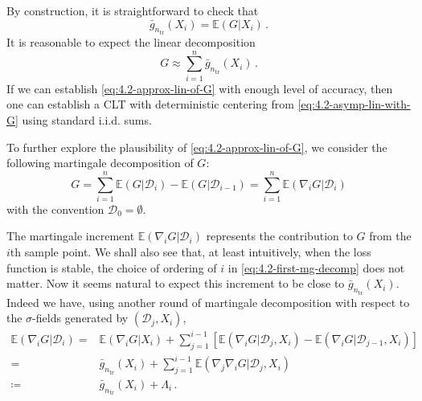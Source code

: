 \documentclass[11pt]{article}
\theoremstyle{plain}
\newcommand{\tr}{{\mathrm{tr}}}
\newcommand{\D}{{\mathcal{D}}}
\begin{document}
By construction, it is straightforward to check that 
$$\bar g_{n_\tr}(X_i)=\mathbb E(G|X_i)\,.$$
It is reasonable to expect the linear decomposition
\begin{equation}\label{eq:4.2-approx-lin-of-G}
G\approx\sum_{i=1}^n \bar g_{n_\tr}(X_i)\,.
\end{equation}
If we can establish \eqref{eq:4.2-approx-lin-of-G} with enough level of accuracy, then one can establish a CLT with deterministic centering from \eqref{eq:4.2-asymp-lin-with-G} using standard i.i.d. sums.

To further explore the plausibility of \eqref{eq:4.2-approx-lin-of-G}, we consider the following martingale decomposition of $G$:
\begin{equation}\label{eq:4.2-first-mg-decomp}
G = \sum_{i=1}^n \mathbb E(G|\D_i) - \mathbb E(G|\D_{i-1}) = \sum_{i=1}^n \mathbb E(\nabla_i G|\D_i)
\end{equation}
with the convention $\D_0=\emptyset$.

The martingale increment $\mathbb E(\nabla_i G|\D_i)$ represents the contribution to $G$ from the $i$th sample point.  We shall also see that, at least intuitively, when the loss function is stable, the choice of ordering of $i$ in \eqref{eq:4.2-first-mg-decomp} does not matter.  Now it seems natural to expect this increment to be close to $\bar g_{n_\tr}(X_i)$. Indeed we have, using another round of martingale decomposition with respect to the $\sigma$-fields generated by $(\D_j,X_i)$,
\begin{align}
    \mathbb E(\nabla_i G|\D_i) = & \mathbb E(\nabla_i G|X_i)+\sum_{j=1}^{i-1}\left[\mathbb E(\nabla_i G|\D_j,X_i)-\mathbb E(\nabla_i G|\D_{j-1},X_i)\right]\nonumber\\
    = & \bar g_{n_\tr}(X_i)+\sum_{j=1}^{i-1}\mathbb E(\nabla_j\nabla_i G|\D_j,X_i)\nonumber\\
    \coloneqq & \bar g_{n_\tr}(X_i)+\Lambda_i\,. \label{eq:4.2-second-mg-decomp}
\end{align}
\end{document}
